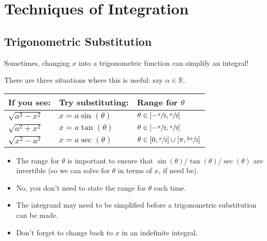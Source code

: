 \chapter{Techniques of Integration}
\section{Trigonometric Substitution}
Sometimes, changing $ x $ into a trigonometric function can
simplify an integral!

There are three situations where this is useful: say $ \alpha\in\mathbb{R} $.

\begin{tabularx}{0.9\linewidth}{@{}YYY@{}}
    If you see:        & Try substituting:   & Range for $ \theta $                                                         \\
    \midrule
    $ \sqrt{a^2-x^2} $ & $ x=a\sin(\theta) $ & $ \theta\in\interval[open]{-\sfrac{\pi}{2}}{\sfrac{\pi}{2}} $                \\
    $ \sqrt{a^2+x^2} $ & $ x=a\tan(\theta) $ & $ \theta\in\interval[open]{-\sfrac{\pi}{2}}{\sfrac{\pi}{2}} $                \\
    $ \sqrt{x^2-a^2} $ & $ x=a\sec(\theta) $ & $ \theta\in\interval{0}{\sfrac{\pi}{2}}\cup\interval{\pi}{\sfrac{3\pi}{2}} $
\end{tabularx}

\begin{Remark}{}{}
    \begin{itemize}
        \item The range for $ \theta $ is important to ensure that
              $ \sin(\theta)/\tan(\theta)/\sec(\theta) $ are invertible (so we can
              solve for $ \theta $ in terms of $ x $, if need be).
        \item No, you don't need to state the range for $ \theta $ each time.
        \item The integrand may need to be simplified before a trigonometric substitution
              can be made.
        \item Don't forget to change back to $ x $ in an indefinite integral.
    \end{itemize}
\end{Remark}

